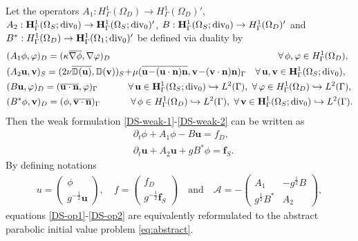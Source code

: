 \documentclass[a4paper, oneside]{book}
\def\calA{{\mathcal{A}}}
\def\u{{\mathbf{u}}}
\def\v{{\mathbf{v}}}
\def\f{{\mathbf{f}}}
\def\calA{{\mathcal{A}}}
\def\n{{\mathbf{n}}}
\def\D{{\mathbb D}}
\begin{document}
Let the operators $A_1:H^1_\Gamma(\Omega_D)\rightarrow H^1_\Gamma(\Omega_D)'$, $A_2:{\bf H}^1_\Gamma(\Omega_S; {\rm div_0})\rightarrow {\bf H}^1_\Gamma(\Omega_S; {\rm div_0})'$, $B:{\bf H}^1_\Gamma(\Omega_S; {\rm div_0})\rightarrow H^1_\Gamma(\Omega_D)'$ and $B^*:H^1_\Gamma(\Omega_D)\rightarrow {\bf H}^1_\Gamma(\Omega_1; {\rm div_0})'$
be defined via duality by
\begin{align*}
&(A_1\phi,\varphi)_D=(\kappa\overline{\nabla\phi},\nabla \varphi)_{D}
\hspace{181pt} \forall\, \phi, \varphi\in H^1_\Gamma(\Omega_D), \\
&(A_2 \u ,{\v} )_S=(2\nu \overline{\D(\u )},\D({\v} ))_{S}\!+\!\mu(\overline{\u\! -\!(\u \cdot\n) \n},{\v}\!-\!({\v} \cdot\n) \n)_{\Gamma}
\hspace{10pt} \forall\,\u ,{\v} \in  {\bf H}^1_\Gamma(\Omega_S; {\rm div_0}) ,\\
&(B \u ,\varphi)_D=(\overline{\u \cdot\n},\varphi )_{\Gamma}
\hspace{33pt}\forall\,\u\in {\bf H}^1_\Gamma(\Omega_S; {\rm div_0}) \hookrightarrow L^2(\Gamma),\,\,\forall\, \varphi \in H^1_\Gamma(\Omega_D) \hookrightarrow L^2(\Gamma),\\
&(B^*\phi, {\v})_D=(\phi,\overline{{\v} \cdot\n} )_{\Gamma}
\hspace{33pt}\forall\,\phi \in H^1_\Gamma(\Omega_D) \hookrightarrow L^2(\Gamma),\,\,\forall\,{\v}\in {\bf H}^1_\Gamma(\Omega_S; {\rm div_0}) \hookrightarrow L^2(\Gamma) .
\end{align*}
Then the weak formulation \eqref{DS-weak-1}-\eqref{DS-weak-2} can be written as
\begin{align}
&\partial_t\phi  +A_1 \phi  - B\u = f_{D} , \label{DS-op1} \\
&\partial_t\u  +A_2 \u + g B^*\phi  = \f_{S} . \label{DS-op2}
\end{align}
By defining notations
\begin{align}
u=\left(\begin{array}{cc}
\phi \\
g^{-\frac12}\u \end{array}\right) ,
\quad
f=\left(\begin{array}{cc}
f_{D} \\
g^{-\frac12}\f_{S} \end{array}\right)
\quad\mbox{and}\quad
\calA
=-\left(\begin{array}{cc}
A_1 &  -g^\frac12B \\
g^{\frac12}B^* &   A_2\end{array}\right) ,
\end{align}
equations \eqref{DS-op1}-\eqref{DS-op2} are equivalently reformulated to the abstract parabolic initial value problem \eqref{eq:abstract}.
\end{document}
